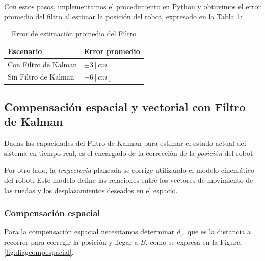 Con estos pasos, implementamos el procedimiento en Python y obtuvimos el error promedio del filtro al estimar la posición del robot, expresado en la Tabla \ref{tab:error_estimacion_kalman}:

\begin{table}[htpb]
    \begin{center}
        \begin{tabular}{|p{3.5cm}|p{1.5cm}|} 
            \hline \rowcolor{test_header_color} \centering
                Escenario              & Error promedio \\
            \hline
                Con Filtro de Kalman   & $\pm3[cm]$ \\
            \hline
                Sin Filtro de Kalman   & $\pm6[cm]$ \\
            \hline
        \end{tabular}
    \end{center} \normalsize \normalfont
    \caption{Error de estimación promedio del Filtro}
    \label{tab:error_estimacion_kalman}
\end{table}


\subsection{Compensación espacial y vectorial con Filtro de Kalman}

Dadas las capacidades del Filtro de Kalman para estimar el estado actual del sistema en tiempo real, es el encargado de la corrección de la \textit{posición} del robot.

Por otro lado, la \textit{trayectoria} planeada se corrige utilizando el modelo cinemático del robot. Este modelo define las relaciones entre los vectores de movimiento de las ruedas y los desplazamientos deseados en el espacio. \\

\subsubsection{Compensación espacial} \mbox{} \vspace{4pt}

Para la compensación espacial necesitamos determinar $d_c$, que es la distancia a recorrer para corregir la posición y llegar a $B$, como se expresa en la Figura \ref{fig:diagcompespacial}.

